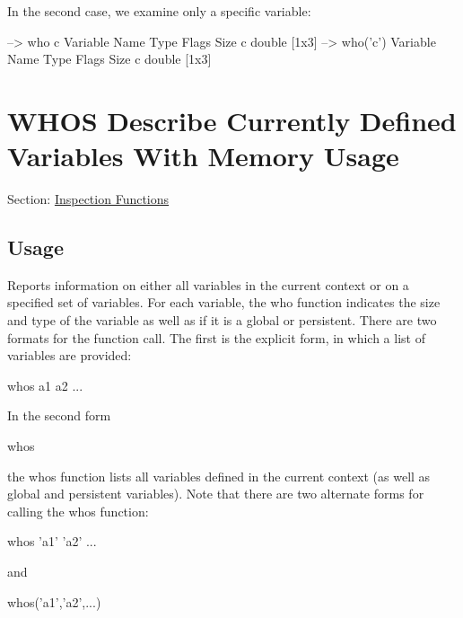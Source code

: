 In the second case, we examine only a specific variable\-:


\begin{DoxyVerbInclude}
--> who c
  Variable Name       Type   Flags             Size
              c    double                    [1x3]
--> who('c')
  Variable Name       Type   Flags             Size
              c    double                    [1x3]
\end{DoxyVerbInclude}
 \hypertarget{inspection_whos}{}\section{W\-H\-O\-S Describe Currently Defined Variables With Memory Usage}\label{inspection_whos}
Section\-: \hyperlink{sec_inspection}{Inspection Functions} \hypertarget{vtkwidgets_vtkxyplotwidget_Usage}{}\subsection{Usage}\label{vtkwidgets_vtkxyplotwidget_Usage}
Reports information on either all variables in the current context or on a specified set of variables. For each variable, the {\ttfamily who} function indicates the size and type of the variable as well as if it is a global or persistent. There are two formats for the function call. The first is the explicit form, in which a list of variables are provided\-: \begin{DoxyVerb}  whos a1 a2 ...
\end{DoxyVerb}
 In the second form \begin{DoxyVerb}  whos
\end{DoxyVerb}
 the {\ttfamily whos} function lists all variables defined in the current context (as well as global and persistent variables). Note that there are two alternate forms for calling the {\ttfamily whos} function\-: \begin{DoxyVerb}  whos 'a1' 'a2' ...
\end{DoxyVerb}
 and \begin{DoxyVerb}  whos('a1','a2',...)
\end{DoxyVerb}
 